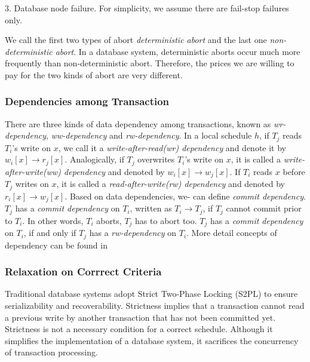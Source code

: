 \documentclass[conference]{IEEEtran}
\begin{document}
3. Database node failure. 
For simplicity, we assume there are fail-stop failures only.

We call the first two types of abort \emph{deterministic abort} and the last one \emph{non-deterministic abort}.
In a database system, deterministic aborts occur much more frequently than non-deterministic abort.
Therefore, the prices we are willing to pay for the two kinds of abort are very different. 

\subsubsection{Dependencies among Transaction}

There are three kinds of data dependency among transactions, known as \emph{wr-dependency}, \emph{ww-dependency} and \emph{rw-dependency}.
In a local schedule ${h}$, if ${T_j}$ reads ${T_i}$'s write on ${x}$,
we call it a \emph{write-after-read(wr) dependency} and denote it by ${w_i[x] \rightarrow r_j[x]}$.
Analogically, if ${T_j}$ overwrites ${T_i}$'s write on ${x}$, it is called a \emph{write-after-write(ww) dependency} and denoted by ${w_i[x] \rightarrow w_j[x]}$.
If ${T_i}$ reads ${x}$ before ${T_j}$ writes on ${x}$, it is called a \emph{read-after-write(rw) dependency} and denoted by ${r_i[x] \rightarrow w_j[x]}$.
Based on data dependencies, we- can define \emph{commit dependency}. ${T_j}$ has a \emph{commit dependency} on ${T_i}$, written as ${T_i \rightarrow T_j}$, if ${T_j}$ cannot commit prior to ${T_i}$.
In other words, ${T_i}$ aborts, ${T_j}$ has to abort too. ${T_j}$ has a \emph{commit dependency} on ${T_i}$, if and only if ${T_j}$ has a \emph{rw-dependency} on ${T_i}$.
More detail concepts of dependency can be found in \cite{Dependency:conf/sigmod/ChrysanthisR90} \cite{Dependency:conf/sigmod/BilirisDGJR94}

\subsubsection{Relaxation on Corrrect Criteria}

Traditional database systems adopt Strict Two-Phase Locking (S2PL) \cite{DBLP:conf/vldb/Raz92} to ensure serializability and recoverability.
Strictness implies that a transaction cannot read a previous write by another transaction that has not been committed yet.
Strictness is not a necessary condition for a correct schedule.
Although it simplifies the implementation of a database system, it sacrifices the concurrency of transaction processing.
\end{document}
